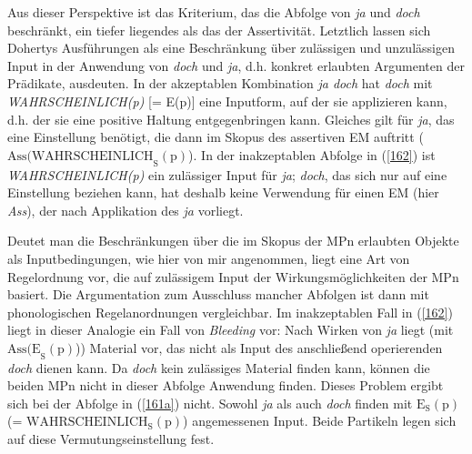 Aus dieser Perspektive ist das Kriterium, das die Abfolge von \textit{ja} und \textit{doch} beschränkt, ein tiefer liegendes als das der Assertivität. Letztlich lassen sich Dohertys Ausführungen als eine Beschränkung über zulässigen und unzulässigen Input in der Anwendung von \textit{doch} und \textit{ja}, d.h. konkret erlaubten Argumenten der Prädikate, ausdeuten. In der akzeptablen Kombination \textit{ja doch} hat \textit{doch} mit \textit{WAHRSCHEINLICH(p)} [= E(p)] eine Inputform, auf der sie applizieren kann, d.h. der sie eine positive Haltung entgegenbringen kann. Gleiches gilt für \textit{ja}, das eine Einstellung benötigt, die dann im Skopus des assertiven EM auftritt ($\textrm{Ass(WAHRSCHEINLICH}_{\textrm{S}}(\textrm{p})$). In der inakzeptablen Abfolge in (\ref{162}) ist \textit{WAHRSCHEINLICH(p)} ein zulässiger Input für \textit{ja}; \textit{doch}, das sich nur auf eine Einstellung beziehen kann, hat deshalb keine Verwendung für einen EM (hier \textit{Ass}), der nach Applikation des \textit{ja} vorliegt.

Deutet man die Beschränkungen über die im Skopus der MPn erlaubten Objekte als Inputbedingungen, wie hier von mir angenommen, liegt eine Art von Regelordnung vor, die auf zulässigem Input der Wirkungsmöglichkeiten der MPn basiert. Die Argumentation zum Ausschluss mancher Abfolgen ist dann mit phonologischen Regelanordnungen vergleichbar. Im inakzeptablen Fall in (\ref{162}) liegt in dieser Analogie ein Fall von \textit{Bleeding} vor: Nach Wirken von \textit{ja} liegt (mit $\textrm{Ass(E}_{\textrm{S}}(\textrm{p})$)) Material vor, das nicht als Input des anschließend operierenden \textit{doch} dienen kann. Da \textit{doch} kein zulässiges Material finden kann, können die beiden MPn nicht in dieser Abfolge Anwendung finden. Dieses Problem ergibt sich bei der Abfolge in (\ref{161a}) nicht. Sowohl \textit{ja} als auch \textit{doch} finden mit $\textrm{E}_{\textrm{S}}(\textrm{p})$ (= $\textrm{WAHRSCHEINLICH}_{\textrm{S}}(\textrm{p})$) angemessenen Input. Beide Partikeln legen sich auf diese Vermutungseinstellung fest.

